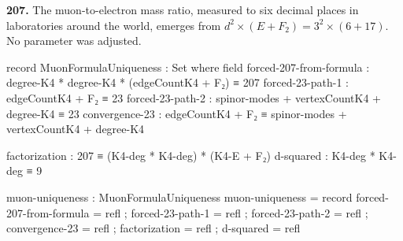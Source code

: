 \documentclass[11pt,a4paper]{book}
\begin{document}
\noindent\textbf{207.} The muon-to-electron mass ratio, measured to six decimal places in laboratories around the world, emerges from $d^2 \times (E + F_2) = 3^2 \times (6 + 17)$. No parameter was adjusted.

\begin{code}
record MuonFormulaUniqueness : Set where
  field
    forced-207-from-formula : degree-K4 * degree-K4 * (edgeCountK4 + F₂) ≡ 207
    forced-23-path-1        : edgeCountK4 + F₂ ≡ 23
    forced-23-path-2        : spinor-modes + vertexCountK4 + degree-K4 ≡ 23
    convergence-23          : edgeCountK4 + F₂ ≡ spinor-modes + vertexCountK4 + degree-K4
    
    factorization : 207 ≡ (K4-deg * K4-deg) * (K4-E + F₂)
    d-squared : K4-deg * K4-deg ≡ 9

muon-uniqueness : MuonFormulaUniqueness
muon-uniqueness = record
  { forced-207-from-formula = refl
  ; forced-23-path-1 = refl
  ; forced-23-path-2 = refl
  ; convergence-23 = refl
  ; factorization = refl
  ; d-squared = refl
  }
\end{code}
\end{document}
